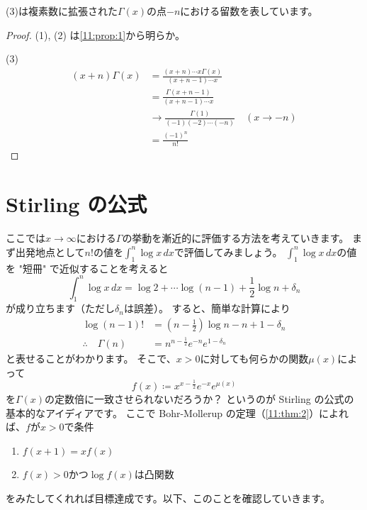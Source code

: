 \documentclass[report]{jlreq}
\begin{document}
(3)は複素数に拡張された$\Gamma(x)$の点$-n$における留数を表しています。

\begin{proof}
    (1), (2) は\cref{11:prop:1}から明らか。

    (3)
    \begin{equation}
        \begin{split}
            (x + n) \Gamma(x)
                &= \frac{(x + n) \cdots x \Gamma(x)}{(x + n - 1) \cdots x} \\
                &= \frac{\Gamma(x + n - 1)}{(x + n - 1) \cdots x} \\
                &\to \frac{\Gamma(1)}{(-1)(-2) \cdots (-n)} \quad (x \to -n) \\
                &= \frac{(-1)^n}{n!}
        \end{split}
    \end{equation}
\end{proof}


%
\section{Stirling の公式}

ここでは$x \to \infty$における$\Gamma$の挙動を漸近的に評価する方法を考えていきます。
まず出発地点として$n!$の値を$\int_1^n \log x\, dx$で評価してみましょう。
$\int_1^n \log x\, dx$の値を "短冊" で近似することを考えると
\begin{equation}
    \int_1^n \log x\, dx
        = \log 2 + \cdots \log (n - 1) + \frac{1}{2} \log n + \delta_n
\end{equation}
が成り立ちます（ただし$\delta_n$は誤差）。
すると、簡単な計算により
\begin{equation}
    \begin{split}
        \log (n-1)! &= \left(n - \frac{1}{2}\right) \log n - n + 1 - \delta_n \\
        \therefore \quad \Gamma(n) &= n^{n - \frac{1}{2}} e^{-n} e^{1-\delta_n}
    \end{split}
\end{equation}
と表せることがわかります。
そこで、$x > 0$に対しても何らかの関数$\mu(x)$によって
\begin{equation}
    f(x) \coloneqq x^{x - \frac{1}{2}} e^{-x} e^{\mu(x)}
    \label{11:eq:7}
\end{equation}
を$\Gamma(x)$の定数倍に一致させられないだろうか？
というのが Stirling の公式の基本的なアイディアです。
ここで Bohr-Mollerup の定理（\cref{11:thm:2}）によれば、$f$が$x > 0$で条件
\begin{enumerate}
    \item $f(x + 1) = x f(x)$
    \item $f(x) > 0$かつ$\log f(x)$は凸関数
\end{enumerate}
をみたしてくれれば目標達成です。以下、このことを確認していきます。
\end{document}

